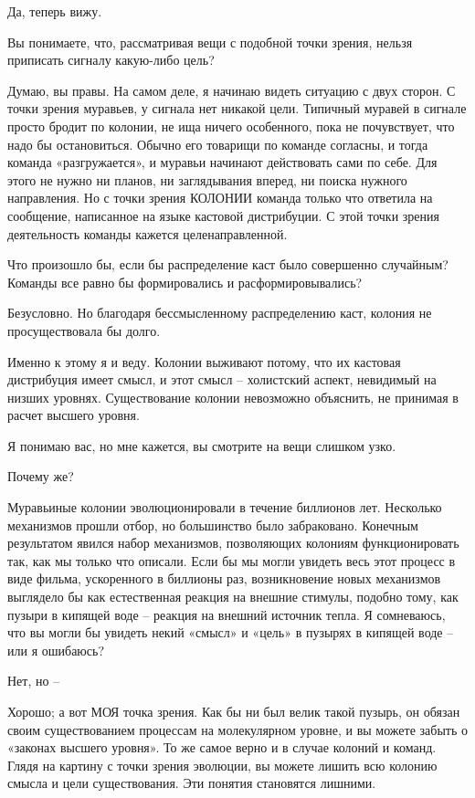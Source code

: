 \documentclass[../main.tex]{subfiles}
\begin{document}
\begin{dialogue}
 Да, теперь вижу.

 Вы понимаете, что, рассматривая вещи с подобной точки зрения, нельзя приписать сигналу какую-либо цель?

 Думаю, вы правы. На самом деле, я начинаю видеть ситуацию с двух сторон. С точки зрения муравьев, у сигнала нет никакой цели. Типичный муравей в сигнале просто бродит по колонии, не ища ничего особенного, пока не почувствует, что надо бы остановиться. Обычно его товарищи по команде согласны, и тогда команда «разгружается», и муравьи начинают действовать сами по себе. Для этого не нужно ни планов, ни заглядывания вперед, ни поиска нужного направления. Но с точки зрения КОЛОНИИ команда только что ответила на сообщение, написанное на языке кастовой дистрибуции. С этой точки зрения деятельность команды кажется целенаправленной.

 Что произошло бы, если бы распределение каст было совершенно случайным? Команды все равно бы формировались и расформировывались?

 Безусловно. Но благодаря бессмысленному распределению каст, колония не просуществовала бы долго.

 Именно к этому я и веду. Колонии выживают потому, что их кастовая дистрибуция имеет смысл, и этот смысл \--- холистский аспект, невидимый на низших уровнях. Существование колонии невозможно объяснить, не принимая в расчет высшего уровня.

 Я понимаю вас, но мне кажется, вы смотрите на вещи слишком узко.

 Почему же?

 Муравьиные колонии эволюционировали в течение биллионов лет. Несколько механизмов прошли отбор, но большинство было забраковано. Конечным результатом явился набор механизмов, позволяющих колониям функционировать так, как мы только что описали. Если бы мы могли увидеть весь этот процесс в виде фильма, ускоренного в биллионы раз, возникновение новых механизмов выглядело бы как естественная реакция на внешние стимулы, подобно тому, как пузыри в кипящей воде \--- реакция на внешний источник тепла. Я сомневаюсь, что вы могли бы увидеть некий «смысл» и «цель» в пузырях в кипящей воде \--- или я ошибаюсь?

 Нет, но \---

 Хорошо; а вот МОЯ точка зрения. Как бы ни был велик такой пузырь, он обязан своим существованием процессам на молекулярном уровне, и вы можете забыть о «законах высшего уровня». То же самое верно и в случае колоний и команд. Глядя на картину с точки зрения эволюции, вы можете лишить всю колонию смысла и цели существования. Эти понятия становятся лишними.


\end{dialogue}
\end{document}
